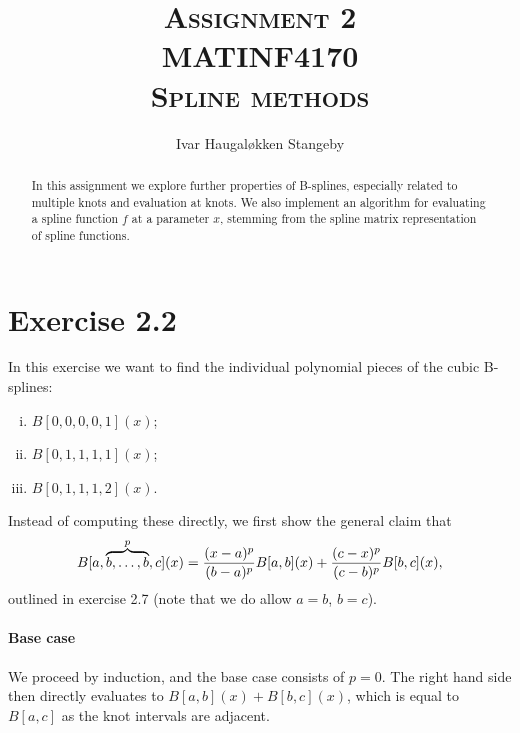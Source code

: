 \documentclass[a4paper]{article}
\title{\textsc{Assignment 2 \\ MATINF4170 \\ Spline methods}}
\author{Ivar Haugal{\o}kken Stangeby}
\begin{document}
    \maketitle

    \begin{abstract}
        In this assignment we explore further properties of B-splines,
        especially related to multiple knots and evaluation at knots. We also
        implement an algorithm for evaluating a spline function $f$ at a
        parameter $x$, stemming from the spline matrix representation of spline
        functions.
    \end{abstract}

    \section*{Exercise 2.2}
    \label{sec:exercise_2_2}
    In this exercise we want to find the individual polynomial pieces of the
    cubic B-splines:
    \begin{enumerate}[i)]
        \item $B[0, 0, 0, 0, 1](x)$;
        \item $B[0, 1, 1, 1, 1](x)$;
        \item $B[0, 1, 1, 1, 2](x)$.
    \end{enumerate}
    Instead of computing these directly, we first show the general claim that
    \begin{equation}
        \notag
        B[a, \overbrace{b, \ldots, b}^p, c](x) = \frac{(x-a)^p}{(b-a)^p}B[a,
        b](x) + \frac{(c-x)^p}{(c-b)^p}B[b, c](x),
    \end{equation}
    outlined in exercise 2.7 (note that we do allow $a = b$, $b = c$).
    \paragraph{Base case}
    We proceed by induction, and the base case consists of $p = 0$. The right
    hand side then directly evaluates to $B[a, b](x) + B[b, c](x)$, which is
    equal to $B[a, c]$ as the knot intervals are adjacent.
\end{document}
